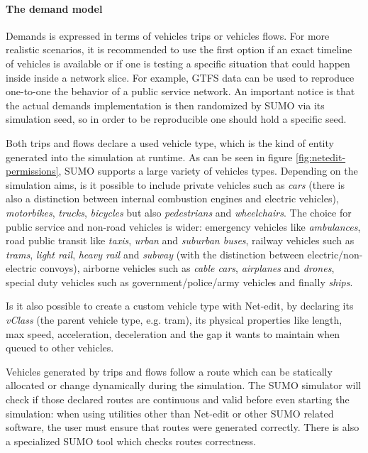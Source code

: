 \paragraph{The demand model}

Demands is expressed in terms of vehicles trips or vehicles flows. For more realistic scenarios, it is recommended to use the first option if an exact timeline of vehicles is available or if one is testing a specific situation that could happen inside inside a network slice. For example, GTFS data can be used to reproduce one-to-one the behavior of a public service network. An important notice is that the actual demands implementation is then randomized by SUMO via its simulation seed, so in order to be reproducible one should hold a specific seed.

Both trips and flows declare a used vehicle type, which is the kind of entity generated into the simulation at runtime. As can be seen in figure \ref{fig:netedit-permissions}, SUMO supports a large variety of vehicles types. Depending on the simulation aims, is it possible to include private vehicles such as \textit{cars} (there is also a distinction between internal combustion engines and electric vehicles), \textit{motorbikes}, \textit{trucks}, \textit{bicycles} but also \textit{pedestrians} and \textit{wheelchairs}. The choice for public service and non-road vehicles is wider: emergency vehicles like \textit{ambulances}, road public transit like \textit{taxis}, \textit{urban} and \textit{suburban buses}, railway vehicles such as \textit{trams}, \textit{light rail}, \textit{heavy rail} and \textit{subway} (with the distinction between electric/non-electric convoys), airborne vehicles such as \textit{cable cars}, \textit{airplanes} and \textit{drones}, special duty vehicles such as government/police/army vehicles and finally \textit{ships}.

Is it also possible to create a custom vehicle type with Net-edit, by declaring its \textit{vClass} (the parent vehicle type, e.g. tram), its physical properties like length, max speed, acceleration, deceleration and the gap it wants to maintain when queued to other vehicles.

Vehicles generated by trips and flows follow a route which can be statically allocated or change dynamically during the simulation. The SUMO simulator will check if those declared routes are continuous and valid before even starting the simulation: when using utilities other than Net-edit or other SUMO related software, the user must ensure that routes were generated correctly. There is also a specialized SUMO tool which checks routes correctness.

